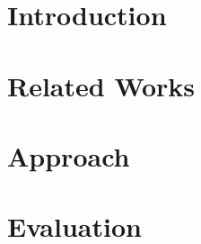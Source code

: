 \documentclass[final]{cvpr}
\begin{document}


\section{Introduction}
\label{sec:introduction}


\section{Related Works}
\label{sec:related}



\section{Approach}
\label{sec:approach}


\section{Evaluation}
\label{sec:evaluation}


{\small


}
\end{document}
